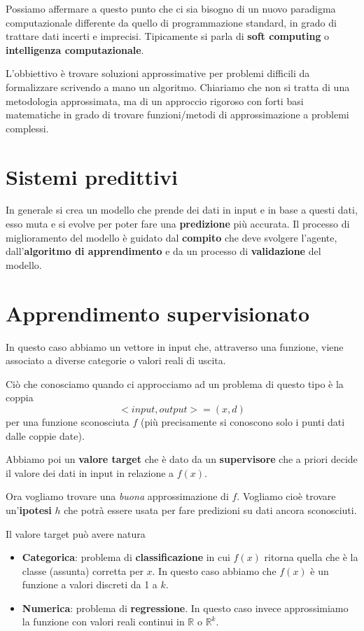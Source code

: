 Possiamo affermare a questo punto che ci sia bisogno di un nuovo paradigma computazionale differente da quello di
programmazione standard, in grado di trattare dati incerti e imprecisi. Tipicamente si parla di \textbf{soft computing} o
\textbf{intelligenza computazionale}.

L'obbiettivo \`e trovare soluzioni approssimative per problemi difficili da formalizzare scrivendo a mano un algoritmo.
Chiariamo che non si tratta di una metodologia approssimata, ma di un approccio rigoroso con forti basi
matematiche in grado di trovare funzioni/metodi di approssimazione a problemi complessi.

\section{Sistemi predittivi}
In generale si crea un modello che prende dei dati in input e in base a questi dati, esso muta e si evolve per poter
fare una \textbf{predizione} pi\`u accurata. Il processo di miglioramento del modello \`e guidato dal \textbf{compito}
che deve svolgere l'agente, dall'\textbf{algoritmo di apprendimento} e da un processo di \textbf{validazione} del modello.

\section{Apprendimento supervisionato}
In questo caso abbiamo un vettore in input che, attraverso una funzione, viene associato a diverse categorie o valori
reali di uscita.

Ci\`o che conosciamo quando ci approcciamo ad un problema di questo tipo \`e la coppia
\[ <input, output> = (x, d) \]
per una funzione sconosciuta $f$ (pi\`u precisamente si conoscono solo i punti dati dalle coppie date).

Abbiamo poi un \textbf{valore target} che \`e dato da un \textbf{supervisore} che a priori decide il valore dei dati
in input in relazione a $f(x)$.

Ora vogliamo trovare una \emph{buona} approssimazione di $f$. Vogliamo cio\`e trovare un'\textbf{ipotesi} $h$ che
potr\`a essere usata per fare predizioni su dati ancora sconosciuti.

Il valore target pu\`o avere natura
\begin{itemize}
	\item \textbf{Categorica}: problema di \textbf{classificazione} in cui $f(x)$ ritorna quella che \`e la classe
	      (assunta) corretta per $x$. In questo caso abbiamo che $f(x)$ \`e un funzione a valori discreti da 1 a $k$.
	\item \textbf{Numerica}: problema di \textbf{regressione}. In questo caso invece approssimiamo la funzione con
	      valori reali continui in $\mathbb{R}$ o $\mathbb{R}^k$.
\end{itemize}

